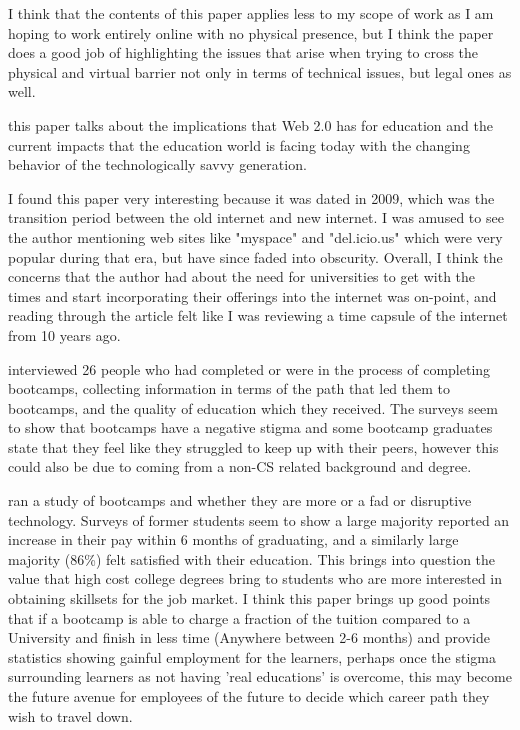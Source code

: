 \documentclass[
	letterpaper, %
]{jdf}
\begin{document}
I think that the contents of this paper applies less to my scope of work as I am hoping to work entirely online with no physical presence, but I think the paper does a good job of highlighting the issues that arise when trying to cross the physical and virtual barrier not only in terms of technical issues, but legal ones as well. 

\citep{4} this paper talks about the implications that Web 2.0 has for education and the current impacts that the education world is facing today with the changing behavior of the technologically savvy generation. 

I found this paper very interesting because it was dated in 2009, which was the transition period between the old internet and new internet. I was amused to see the author mentioning web sites like "myspace" and "del.icio.us" which were very popular during that era, but have since faded into obscurity. Overall, I think the concerns that the author had about the need for universities to get with the times and start incorporating their offerings into the internet was on-point, and reading through the article felt like I was reviewing a time capsule of the internet from 10 years ago. 

\citep{5} interviewed 26 people who had completed or were in the process of completing bootcamps, collecting information in terms of the path that led them to bootcamps, and the quality of education which they received. The surveys seem to show that bootcamps have a negative stigma and some bootcamp graduates state that they feel like they struggled to keep up with their peers, however this could also be due to coming from a non-CS related background and degree. 

\citep{6} ran a study of bootcamps and whether they are more or a fad or disruptive technology. Surveys of former students seem to show a large majority reported an increase in their pay within 6 months of graduating, and a similarly large majority (86\%) felt satisfied with their education. This brings into question the value that high cost college degrees bring to students who are more interested in obtaining skillsets for the job market. I think this paper brings up good points that if a bootcamp is able to charge a fraction of the tuition compared to a University and finish in less time (Anywhere between 2-6 months) and provide statistics showing gainful employment for the learners, perhaps once the stigma surrounding learners as not having 'real educations' is overcome, this may become the future avenue for employees of the future to decide which career path they wish to travel down.
\end{document}
